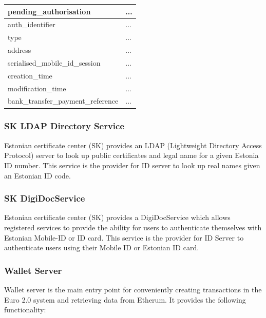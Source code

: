 \documentclass[a4paper,12pt]{article} %
\begin{document}
{\begin{center}
\begin{tabular}{ | l | p{10cm} | }
 \hline
 \textbf{pending\_authorisation} & ...
 \\ \hline\hline
 auth\_identifier & ...
 \\ \hline
 type & ...
 \\ \hline
 address & ...
 \\ \hline
 serialised\_mobile\_id\_session & ...
 \\ \hline
 creation\_time & ...
 \\ \hline
 modification\_time & ...
 \\ \hline
 bank\_transfer\_payment\_reference & ...
 \\ \hline
\end{tabular}
\end{center}
\label{tab:idDatabasePendingAuthorization}

\subsubsection{SK LDAP Directory Service}

Estonian certificate center (SK)\cite{aboutSk2017} provides an LDAP (Lightweight Directory Access Protocol) server to look up public certificates and legal name for a given Estonia ID number\cite{skAboutLdap2017}\cite{skLdapTechnical2017}. This service is the provider for ID server to look up real names given an Estonian ID code.

\subsubsection{SK DigiDocService}

Estonian certificate center (SK) provides a DigiDocService which allows registered services to provide the ability for users to authenticate themselves with Estonian Mobile-ID or ID card\cite{skDigiDocService2017}. This service is the provider for ID Server to authenticate users using their Mobile ID or Estonian ID card.

\subsubsection{Wallet Server} \label{sssec:3.5:walletServer}

Wallet server is the main entry point for conveniently creating transactions in the Euro 2.0 system and retrieving data from Etherum. It provides the following functionality:

}
\end{document}
